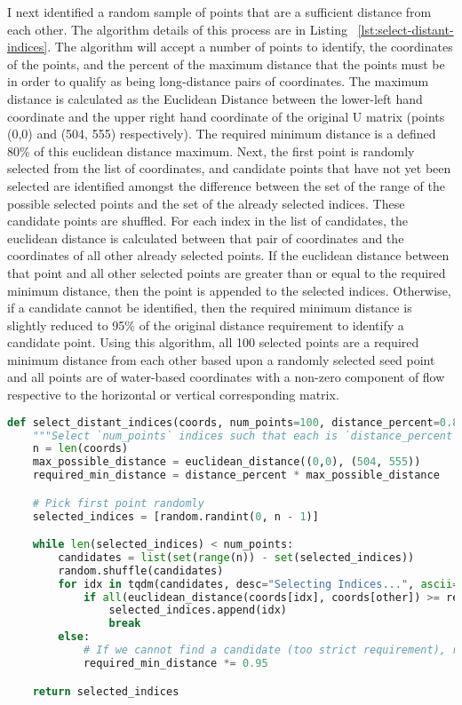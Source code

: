 \documentclass[11pt]{article}
\begin{document}
I next identified a random sample of points that are a sufficient distance from each other. The algorithm details of this process are in Listing ~\ref{lst:select-distant-indices}. The algorithm will accept a number of points to identify, the coordinates of the points, and the percent of the maximum distance that the points must be in order to qualify as being long-distance pairs of coordinates. The maximum distance is calculated as the Euclidean Distance between the lower-left hand coordinate and the upper right hand coordinate of the original U matrix (points (0,0) and (504, 555) respectively). The required minimum distance is a defined 80\% of this euclidean distance maximum. Next, the first point is randomly selected from the list of coordinates, and candidate points that have not yet been selected are identified amongst the difference between the set of the range of the possible selected points and the set of the already selected indices. These candidate points are shuffled. For each index in the list of candidates, the euclidean distance is calculated between that pair of coordinates and the coordinates of all other already selected points. If the euclidean distance between that point and all other selected points are greater than or equal to the required minimum distance, then the point is appended to the selected indices. Otherwise, if a candidate cannot be identified, then the required minimum distance is slightly reduced to  95\% of the original distance requirement to identify a candidate point. Using this algorithm, all 100 selected points are a required minimum distance from each other based upon a randomly selected seed point and all points are of water-based coordinates with a non-zero component of flow respective to the horizontal or vertical corresponding matrix.  

\begin{lstlisting}[language=Python, label=lst:select-distant-indices, caption={Identifying long-range distances.}]
    def select_distant_indices(coords, num_points=100, distance_percent=0.8):
    """Select `num_points` indices such that each is `distance_percent` away from the others."""
    n = len(coords)
    max_possible_distance = euclidean_distance((0,0), (504, 555))
    required_min_distance = distance_percent * max_possible_distance

    # Pick first point randomly
    selected_indices = [random.randint(0, n - 1)]

    while len(selected_indices) < num_points:
        candidates = list(set(range(n)) - set(selected_indices))
        random.shuffle(candidates)
        for idx in tqdm(candidates, desc="Selecting Indices...", ascii=""):
            if all(euclidean_distance(coords[idx], coords[other]) >= required_min_distance for other in selected_indices):
                selected_indices.append(idx)
                break
        else:
            # If we cannot find a candidate (too strict requirement), relax the minimum distance slightly
            required_min_distance *= 0.95

    return selected_indices

\end{lstlisting}
\FloatBarrier
\end{document}
